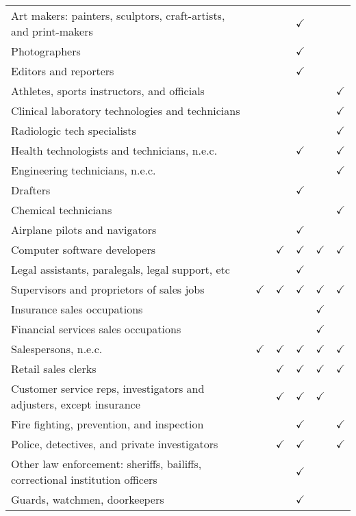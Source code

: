 \begin{tabular}[t]{llllll}
Art makers: painters, sculptors, craft-artists, and print-makers &  &  & $\checkmark$ &  & \\
Photographers &  &  & $\checkmark$ &  & \\
Editors and reporters &  &  & $\checkmark$ &  & \\
Athletes, sports instructors, and officials &  &  &  &  & $\checkmark$\\
Clinical laboratory technologies and technicians &  &  &  &  & $\checkmark$\\
Radiologic tech specialists &  &  &  &  & $\checkmark$\\
Health technologists and technicians, n.e.c. &  &  & $\checkmark$ &  & $\checkmark$\\
Engineering technicians, n.e.c. &  &  &  &  & $\checkmark$\\
Drafters &  &  & $\checkmark$ &  & \\
Chemical technicians &  &  &  &  & $\checkmark$\\
Airplane pilots and navigators &  &  & $\checkmark$ &  & \\
Computer software developers &  & $\checkmark$ & $\checkmark$ & $\checkmark$ & $\checkmark$\\
Legal assistants, paralegals, legal support, etc &  &  & $\checkmark$ &  & \\
Supervisors and proprietors of sales jobs & $\checkmark$ & $\checkmark$ & $\checkmark$ & $\checkmark$ & $\checkmark$\\
Insurance sales occupations &  &  &  & $\checkmark$ & \\
Financial services sales occupations &  &  &  & $\checkmark$ & \\
Salespersons, n.e.c. & $\checkmark$ & $\checkmark$ & $\checkmark$ & $\checkmark$ & $\checkmark$\\
Retail sales clerks &  & $\checkmark$ & $\checkmark$ & $\checkmark$ & $\checkmark$\\
Customer service reps, investigators and adjusters, except insurance &  & $\checkmark$ & $\checkmark$ & $\checkmark$ & \\
Fire fighting, prevention, and inspection &  &  & $\checkmark$ &  & $\checkmark$\\
Police, detectives, and private investigators &  & $\checkmark$ & $\checkmark$ &  & $\checkmark$\\
Other law enforcement: sheriffs, bailiffs, correctional institution officers &  &  & $\checkmark$ &  & \\
Guards, watchmen, doorkeepers &  &  & $\checkmark$ &  & \\

\end{tabular}
